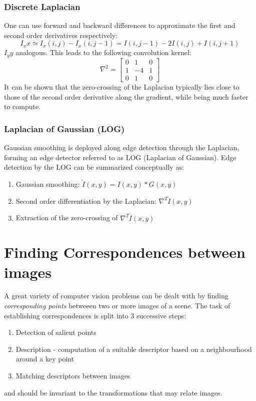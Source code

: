 \documentclass{article}
\begin{document}
\subsubsection{Discrete Laplacian}
One can use forward and backward differences to approximate the first and second order derivatives respectively:
\[
    I_xx \simeq I_x(i,j)-I_x(i,j-1)=I(i,j-1) - 2I(i,j)+I(i,j+1)
\]
$I_yy$ analogous. This leads to the following convolution kernel:
\[
    \nabla^2 = \begin{bmatrix}
        0 & 1  & 0 \\
        1 & -4  & 1 \\
        0 & 1  & 0 
    \end{bmatrix}
\]
It can be shown that the zero-crossing of the Laplacian typically lies close to those of the second order derivative along the gradient, while being much faster to compute. 
\subsubsection{Laplacian of Gaussian (LOG)}
Gaussian smoothing is deployed along edge detection through the Laplacian, forming an edge detector referred to as LOG (Laplacian of Gaussian). Edge detection by the LOG can be summarized conceptually as:
\begin{enumerate}
    \item Gaussian smoothing: $\tilde{I}(x,y) = I(x,y) \ast G(x,y)$ 
    \item Second order differentiation by the Laplacian: $\nabla^2\tilde{I}(x,y)$
    \item Extraction of the zero-crossing of $\nabla^2\tilde{I}(x,y)$ 
\end{enumerate}
\section{Finding Correspondences between images}
A great variety of computer vision problems can be dealt with by finding \emph{corresponding points} betweeen two or more images of a scene. The task of establishing correspondences is split into 3 successive steps: 
\begin{enumerate}
    \item Detection of salient points
    \item Description - computation of a suitable descriptor based on a neighbourhood around a key point 
    \item Matching descriptors between images
\end{enumerate}
and should be invariant to the transformations that may relate images. 
\end{document}
